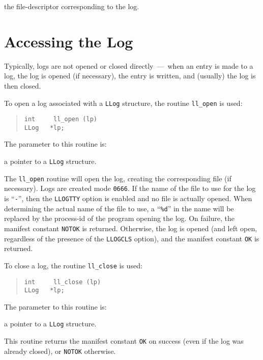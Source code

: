 \begin{describe}
\item[\verb"ll\_fd":] the file-descriptor corresponding to the log.
\end{describe}

\section	{Accessing the Log}
Typically,
logs are not opened or closed directly~---~when an entry is made to a log,
the log is opened (if necessary), the entry is written, and (usually) the log
is then closed.

To open a log associated with a \verb"LLog" structure,
the routine \verb"ll_open" is used:
\begin{quote}\small\begin{verbatim}
int     ll_open (lp)
LLog   *lp;
\end{verbatim}\end{quote}
The parameter to this routine is:
\begin{describe}
\item[\verb"lp":] a pointer to a \verb"LLog" structure.
\end{describe}
The \verb"ll_open" routine will open the log,
creating the corresponding file (if necessary).
Logs are created mode \verb"0666".
If the name of the file to use for the log is ``\verb"-"'',
then the \verb"LLOGTTY" option is enabled and no file is actually opened.
When determining the actual name of the file to use,
a ``\verb"%d"'' in the name will be replaced by the process-id of the program
opening the log.
On failure, the manifest constant \verb"NOTOK" is returned.
Otherwise, the log is opened
(and left open, regardless of the presence of the \verb"LLOGCLS" option),
and the manifest constant \verb"OK" is returned.

To close a log, the routine \verb"ll_close" is used:
\begin{quote}\small\begin{verbatim}
int     ll_close (lp)
LLog   *lp;
\end{verbatim}\end{quote}
The parameter to this routine is:
\begin{describe}
\item[\verb"lp":] a pointer to a \verb"LLog" structure.
\end{describe}
This routine returns the manifest constant \verb"OK" on success
(even if the log was already closed),
or \verb"NOTOK" otherwise.


